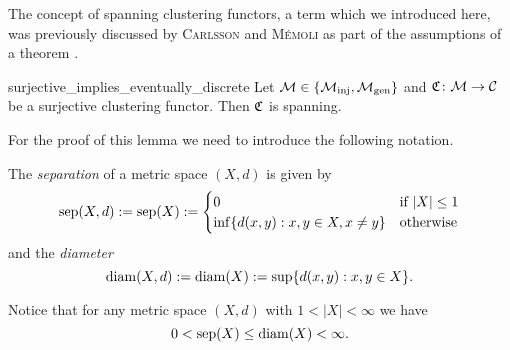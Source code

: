 The concept of spanning clustering functors, a term which we introduced here, was previously discussed by \textsc{Carlsson} and \textsc{M\'emoli} as part of the assumptions of a theorem \cite[Thm.~6.4]{Carlsson2010}.

\begin{lemma}{}{surjective_implies_eventually_discrete}
    Let $\mathcal{M} \in \{{\mathcal{M}_\mathrm{inj}}, {\mathcal{M}_\mathrm{gen}}\}$ and $\mathfrak{C}\colon \mathcal{M} \to \mathcal{C}$ be a surjective clustering functor. Then $\mathfrak{C}$ is spanning.
\end{lemma}

For the proof of this lemma we need to introduce the following notation.

\begin{definition}{}{}
    The \emph{separation} of a metric space $(X,d)$ is given by
    \begin{equation*}
    \mathrm{sep}(X,d) := \mathrm{sep}(X) := \begin{cases}
        0 & \text{if } |X| \le 1\\
        \inf\{d(x,y): x,y \in X, x \neq y\} & \text{otherwise}
    \end{cases}
    \end{equation*}
    and the \emph{diameter}
    \begin{equation*}
    \mathrm{diam}(X,d) := \mathrm{diam}(X) := \sup\{d(x,y): x,y \in X\}.
    \end{equation*}
\end{definition}

Notice that for any metric space $(X,d)$ with $1 < |X| < \infty$ we have
$$
0 < \mathrm{sep}(X) \leq \mathrm{diam}(X) < \infty.
$$

